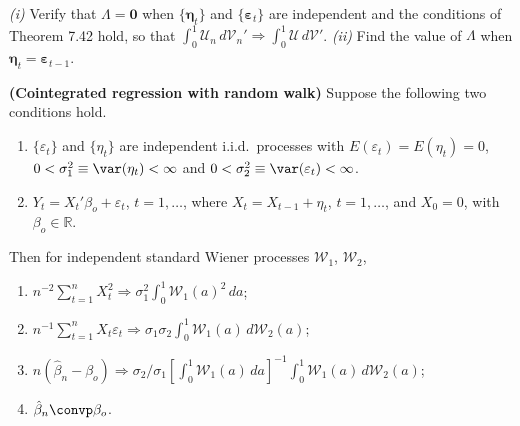 \begin{exercises}
\item\label{ex:7.43} \emph{(i)} Verify that $\Lambda = \mathbf{0}$ when $\{\boldsymbol{\eta}_t\}$ and $\{\boldsymbol{\varepsilon}_t\}$ are independent and the conditions of Theorem 7.42 hold, so that $\int_0^1 \boldsymbol{\mathcal{U}}_n\,d\boldsymbol{\mathcal{V}}_n' \Rightarrow \int_0^1 \boldsymbol{\mathcal{U}}\,d\boldsymbol{\mathcal{V}}'$. \emph{(ii)} Find the value of $\Lambda$ when $\boldsymbol{\eta}_t = \boldsymbol{\varepsilon}_{t-1}$.

\item\label{ex:7.44} \textbf{(Cointegrated regression with random walk)} Suppose the following two conditions hold.
\begin{enumerate}[label=(\roman*)]
\item $\{\varepsilon_t\}$ and $\{\eta_t\}$ are independent i.i.d.\ processes with $E(\varepsilon_t) = E(\eta_t) = 0$, $0 < \sigma_1^2 \equiv \var(\eta_t) < \infty$ and $0 < \sigma_2^2 \equiv \var(\varepsilon_t) < \infty$.
\item $Y_t = X_t' \beta_o + \varepsilon_t$, $t = 1, \ldots$, where $X_t = X_{t-1} + \eta_t$, $t = 1, \ldots$, and $X_0 = 0$, with $\beta_o \in \mathbb{R}$.
\end{enumerate}

Then for independent standard Wiener processes $\mathcal{W}_1$, $\mathcal{W}_2$,
\begin{enumerate}[label=(\alph*)]
\item $n^{-2}\sum_{t=1}^{n} X_t^2 \Rightarrow \sigma_1^2 \int_0^1 \mathcal{W}_1(a)^2\,da$;
\item $n^{-1}\sum_{t=1}^{n} X_t \varepsilon_t \Rightarrow \sigma_1 \sigma_2 \int_0^1 \mathcal{W}_1(a)\,d\mathcal{W}_2(a)$;
\item $n(\hat{\beta}_n - \beta_o) \Rightarrow \sigma_2 / \sigma_1 \left[\int_0^1 \mathcal{W}_1(a)\,da\right]^{-1}\int_0^1 \mathcal{W}_1(a)\,d\mathcal{W}_2(a)$;
\item $\hat{\beta}_n \convp \beta_o$.
\end{enumerate}
\end{exercises}

